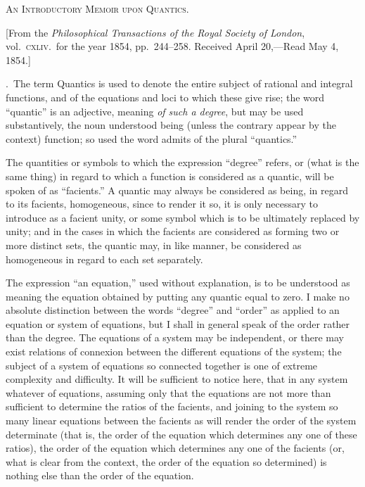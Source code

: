 \documentclass[11pt,a4paper]{article}
\begin{document}
\begin{center}\textsc{An Introductory Memoir upon Quantics.}\end{center}

[From the \textit{Philosophical Transactions of the Royal Society of London}, vol.\ \textsc{cxliv}.\ for the year 1854, pp.\ 244--258. Received April 20,---Read May 4, 1854.]

\medskip

.\ The term Quantics is used to denote the entire subject of rational and integral functions, and of the equations and loci to which these give rise; the word ``quantic'' is an adjective, meaning \textit{of such a degree}, but may be used substantively, the noun understood being (unless the contrary appear by the context) function; so used the word admits of the plural ``quantics.''

\medskip

The quantities or symbols to which the expression ``degree'' refers, or (what is the same thing) in regard to which a function is considered as a quantic, will be spoken of as ``facients.'' A quantic may always be considered as being, in regard to its facients, homogeneous, since to render it so, it is only necessary to introduce as a facient unity, or some symbol which is to be ultimately replaced by unity; and in the cases in which the facients are considered as forming two or more distinct sets, the quantic may, in like manner, be considered as homogeneous in regard to each set separately.

\medskip

The expression ``an equation,'' used without explanation, is to be understood as meaning the equation obtained by putting any quantic equal to zero. I make no absolute distinction between the words ``degree'' and ``order'' as applied to an equation or system of equations, but I shall in general speak of the order rather than the degree. The equations of a system may be independent, or there may exist relations of connexion between the different equations of the system; the subject of a system of equations so connected together is one of extreme complexity and difficulty. It will be sufficient to notice here, that in any system whatever of equations, assuming only that the equations are not more than sufficient to determine the ratios of the facients, and joining to the system so many linear equations between the facients as will render the order of the system determinate (that is, the order of the equation which determines any one of these ratios), the order of the equation which determines any one of the facients (or, what is clear from the context, the order of the equation so determined) is nothing else than the order of the equation.
\end{document}
